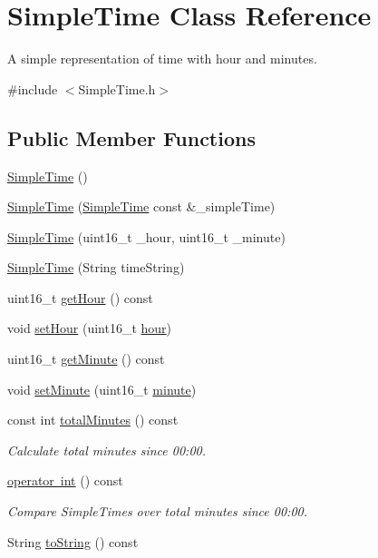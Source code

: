\hypertarget{class_simple_time}{}\section{Simple\+Time Class Reference}
\label{class_simple_time}


A simple representation of time with hour and minutes.  




{\ttfamily \#include $<$Simple\+Time.\+h$>$}

\subsection*{Public Member Functions}
\begin{DoxyCompactItemize}
\item 
\mbox{\hyperlink{class_simple_time_adbc19913746c729324ba93d1efd82a0d}{Simple\+Time}} ()
\item 
\mbox{\hyperlink{class_simple_time_abf929f0ba662f85ab42a9d2eb6a98a4d}{Simple\+Time}} (\mbox{\hyperlink{class_simple_time}{Simple\+Time}} const \&\+\_\+simple\+Time)
\item 
\mbox{\hyperlink{class_simple_time_ac9bd49ce2f132b593d3d0d47c9efdb08}{Simple\+Time}} (uint16\+\_\+t \+\_\+hour, uint16\+\_\+t \+\_\+minute)
\item 
\mbox{\hyperlink{class_simple_time_a95825a96f5afb95060a3b36d78ac11e9}{Simple\+Time}} (String time\+String)
\item 
uint16\+\_\+t \mbox{\hyperlink{class_simple_time_a386922a41d88aaab69497730b163cadf}{get\+Hour}} () const
\item 
void \mbox{\hyperlink{class_simple_time_aba0375d3ee93859fdb37b15532c149a4}{set\+Hour}} (uint16\+\_\+t \mbox{\hyperlink{class_simple_time_a3818c7ef3b2f7d685e403f6bbf993bdc}{hour}})
\item 
uint16\+\_\+t \mbox{\hyperlink{class_simple_time_a02c7df278fb87be73998306330198018}{get\+Minute}} () const
\item 
void \mbox{\hyperlink{class_simple_time_ac5b1e04be8f134f378950dcb6f22f966}{set\+Minute}} (uint16\+\_\+t \mbox{\hyperlink{class_simple_time_ad8cfa601eddca64717e27a8ec95cddfa}{minute}})
\item 
const int \mbox{\hyperlink{class_simple_time_a9fd5a5025ccd3bd60d4049c5c113ec4c}{total\+Minutes}} () const
\begin{DoxyCompactList}\small\item\em Calculate total minutes since 00\+:00. \end{DoxyCompactList}\item 
\mbox{\hyperlink{class_simple_time_a9d034d06249024ed0366c99029243168}{operator int}} () const
\begin{DoxyCompactList}\small\item\em Compare Simple\+Times over total minutes since 00\+:00. \end{DoxyCompactList}\item 
String \mbox{\hyperlink{class_simple_time_a9de383bf9aaf23dbba9b13e0b9b4f0ed}{to\+String}} () const
\end{DoxyCompactItemize}

